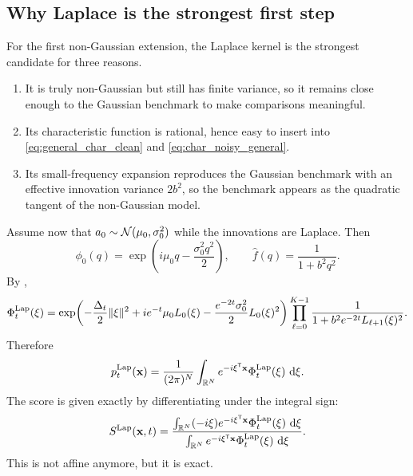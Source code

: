 \documentclass[11pt]{article}
\begin{document}
\subsection{Why Laplace is the strongest first step}

For the first non-Gaussian extension, the Laplace kernel is the strongest candidate for three reasons.
\begin{enumerate}[label=(\arabic*),leftmargin=1cm]
\item It is truly non-Gaussian but still has finite variance, so it remains close enough to the Gaussian benchmark to make comparisons meaningful.
\item Its characteristic function is rational, hence easy to insert into \eqref{eq:general_char_clean} and \eqref{eq:char_noisy_general}.
\item Its small-frequency expansion reproduces the Gaussian benchmark with an effective innovation variance $2b^2$, so the benchmark appears as the quadratic tangent of the non-Gaussian model.
\end{enumerate}

Assume now that $a_0\sim\mathcal{N}(\mu_0,\sigma_0^2)$ while the innovations are Laplace. Then
\begin{equation}
 \phi_0(q)=\exp\!\left(i\mu_0q-\frac{\sigma_0^2q^2}{2}\right),
 \qquad
 \widehat f(q)=\frac{1}{1+b^2q^2}.
\end{equation}
By ,
\begin{equation}\label{eq:laplace_char_noisy}
 \Phi_t^{\mathrm{Lap}}(\xi)
 =\exp\!\left(-\frac{\Delta_t}{2}\lVert \xi\rVert^2
 +ie^{-t}\mu_0L_0(\xi)
 -\frac{e^{-2t}\sigma_0^2}{2}L_0(\xi)^2\right)
 \prod_{\ell=0}^{K-1}
 \frac{1}{1+b^2e^{-2t}L_{\ell+1}(\xi)^2}.
\end{equation}
Therefore
\begin{equation}\label{eq:laplace_density_inverse}
 p_t^{\mathrm{Lap}}(\mathbf x)
 =\frac{1}{(2\pi)^N}\int_{\mathbb{R}^N}
 e^{-i\xi^{\mathsf{T}}\mathbf x}\Phi_t^{\mathrm{Lap}}(\xi)
 \,\,\mathrm{d}\xi.
\end{equation}
The score is given exactly by differentiating under the integral sign:
\begin{equation}\label{eq:laplace_score_ratio}
 S^{\mathrm{Lap}}(\mathbf x,t)
 =\frac{\int_{\mathbb{R}^N}(-i\xi)
 e^{-i\xi^{\mathsf{T}}\mathbf x}\Phi_t^{\mathrm{Lap}}(\xi)
 \,\,\mathrm{d}\xi}{\int_{\mathbb{R}^N}
 e^{-i\xi^{\mathsf{T}}\mathbf x}\Phi_t^{\mathrm{Lap}}(\xi)
 \,\,\mathrm{d}\xi}.
\end{equation}
This is not affine anymore, but it is exact.
\end{document}
